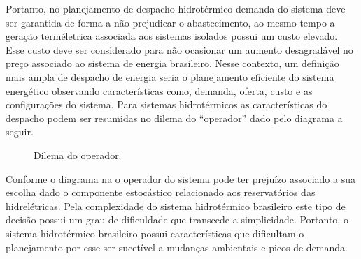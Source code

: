 Portanto, no planejamento de despacho hidrot\'ermico demanda do sistema deve ser garantida de forma a n\~ao prejudicar o
abastecimento, ao mesmo tempo a gera\c c\~ao term\'eletrica associada aos sistemas isolados possui um custo elevado. 
Esse custo deve ser considerado para n\~ao ocasionar um
aumento desagrad\'avel no pre\c co  associado ao sistema de energia brasileiro. 
Nesse contexto, um defini\c c\~ao mais ampla de despacho de energia seria o planejamento 
eficiente do sistema energ\'etico observando caracter\'isticas como, demanda, oferta, custo e
  as configura\c c\~oes do sistema. Para sistemas
 hidrot\'ermicos as caracter\'isticas do despacho podem ser resumidas no dilema do
 ``operador'' dado pelo diagrama a seguir.
 \begin{figure}[!h]
 \centering
 \caption {Dilema do operador.}  
 \label{dilop}
 \end{figure}

 Conforme o diagrama na  o operador do sistema pode ter preju\'izo associado a sua escolha dado o componente
 estoc\'astico
relacionado aos
reservat\'orios das hidrel\'etricas. Pela complexidade do sistema hidrot\'ermico
brasileiro este tipo de decis\~ao possui um grau de dificuldade que transcede a simplicidade. Portanto, o sistema
hidrot\'ermico brasileiro possui caracter\'isticas que dificultam o planejamento por esse ser sucet\'ivel a mudan\c cas
ambientais e picos de demanda. 

